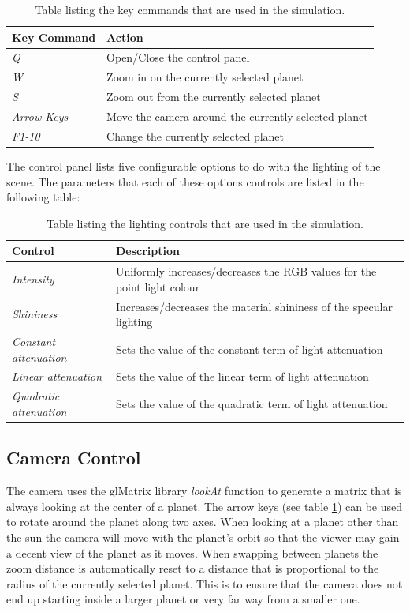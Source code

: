 \documentclass[paper=a4, fontsize=11pt]{scrartcl}	%
\numberwithin{equation}{section}															%
\numberwithin{figure}{section}																%
\numberwithin{table}{section}																%
\begin{document}
\begin{table}[H]
\centering
\begin{tabular}{ l p{12cm}}
Key Command & Action \\ \hline
\textit{Q} & Open/Close the control panel \\ \hline
\textit{W} & Zoom in on the currently selected planet \\ \hline
\textit{S} & Zoom out from the currently selected planet \\ \hline
\textit{Arrow Keys} & Move the camera around the currently selected planet \\ \hline
\textit{F1-10} & Change the currently selected planet \\ \hline

\end{tabular}
\caption{Table listing the key commands that are used in the simulation.}
\label{table:keyboard-controls}
\end{table}

The control panel lists five configurable options to do with the lighting of the scene. The parameters that each of these options controls are listed in the following table:

\begin{table}[H]
\centering
\begin{tabular}{ l p{12cm}}
Control & Description \\ \hline
\textit{Intensity} & Uniformly increases/decreases the RGB values for the point light colour \\ \hline
\textit{Shininess} & Increases/decreases the material shininess of the specular lighting\\ \hline
\textit{Constant attenuation} & Sets the value of the constant term of light attenuation \\ \hline
\textit{Linear attenuation} & Sets the value of the linear term of light attenuation \\ \hline
\textit{Quadratic attenuation} & Sets the value of the quadratic term of light attenuation \\ \hline

\end{tabular}
\caption{Table listing the lighting controls that are used in the simulation.}
\label{table:lighting-controls}
\end{table}

\subsection{Camera Control}
The camera uses the glMatrix library \textit{lookAt} function to generate a matrix that is always looking at the center of a planet. The arrow keys (see table \ref{table:keyboard-controls}) can be used to rotate around the planet along two axes. When looking at a planet other than the sun the camera will move with the planet's orbit so that the viewer may gain a decent view of the planet as it moves. When swapping between planets the zoom distance is automatically reset to a distance that is proportional to the radius of the currently selected planet. This is to ensure that the camera does not end up starting inside a larger planet or very far way from a smaller one.
\end{document}
